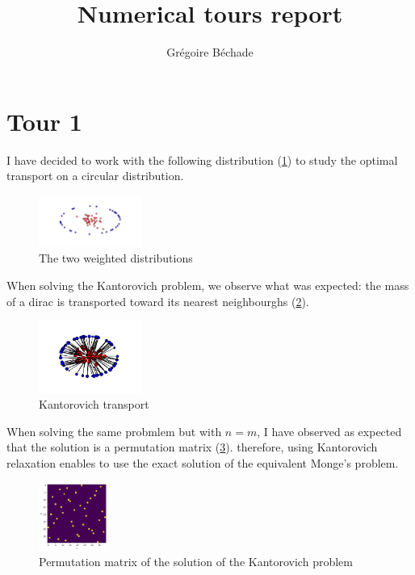 \documentclass{article}
\title{Numerical tours report}
\author{Grégoire Béchade}
\begin{document}
\maketitle



\section{Tour 1}

I have decided to work with the following distribution (\ref{fig:2distrib}) to study the optimal transport on a circular distribution. 




\begin{figure}[h]
  \centering
  \includegraphics[width=0.3\textwidth]{images/distrib.png}
    \caption{The two weighted distributions}
  \label{fig:2distrib}
\end{figure}

When solving the Kantorovich problem, we observe what was expected: the mass of a dirac is transported toward its nearest neighbourghs (\ref{fig:transport}).
\begin{figure}[h]
  \centering
  \includegraphics[width=0.3\textwidth]{images/close.png}
    \caption{Kantorovich transport}
  \label{fig:transport}
\end{figure} 

When solving the same probmlem but with $n=m$, I have observed as expected that the solution is a permutation matrix (\ref{fig:permutation}). 
therefore, using Kantorovich relaxation enables to use the exact solution of the equivalent Monge's problem.  

\begin{figure}[h]
  \centering
  \includegraphics[width=0.2\textwidth]{images/permutation_matrix.png}
  \caption{Permutation matrix of the solution of the Kantorovich problem}
  \label{fig:permutation}
\end{figure}
\end{document}
